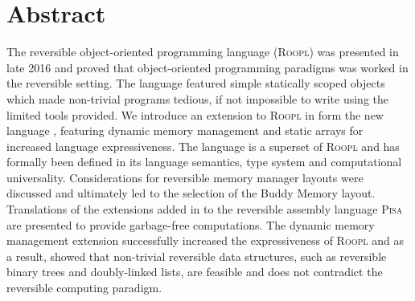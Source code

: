 \chapter*{Abstract}

The reversible object-oriented programming language (\textsc{Roopl}) was presented in late 2016 and proved that object-oriented programming paradigms was worked in the reversible setting. The language featured simple statically scoped objects which made non-trivial programs tedious, if not impossible to write using the limited tools provided.
We introduce an extension to \textsc{Roopl} in form the new language \rooplpp, featuring dynamic memory management and static arrays for increased language expressiveness. The language is a superset of \textsc{Roopl} and has formally been defined in its language semantics, type system and computational universality. Considerations for reversible memory manager layouts were discussed and ultimately led to the selection of the Buddy Memory layout. Translations of the extensions added in \rooplpp to the reversible assembly language \textsc{Pisa} are presented to provide garbage-free computations. The dynamic memory management extension successfully increased the expressiveness of \textsc{Roopl} and as a result, showed that non-trivial reversible data structures, such as reversible binary trees and doubly-linked lists, are feasible and does not contradict the reversible computing paradigm.